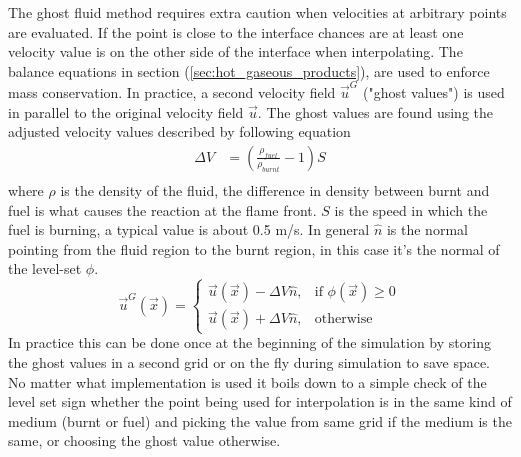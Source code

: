 \label{sec:method_two_phase_flow}
The ghost fluid method requires extra caution when velocities at arbitrary points are evaluated. If the point is close to the interface chances are at least one velocity value is on the other side of the interface when interpolating. The balance equations in section (\ref{sec:hot_gaseous_products}), are used to enforce mass conservation. In practice, a second velocity field \begin{math}\vec{u}^{ G}\end{math} ("ghost values") is used in parallel to the original velocity field \begin{math}\vec{u}\end{math}. The ghost values are found using the adjusted velocity values described by following equation
\begin{align}
\Delta V  & = (\frac{\rho_{fuel}}{\rho_{burnt}} - 1)S \\
\end{align}
where $\rho $ is the density of the fluid, the difference in density between burnt and fuel is what causes the reaction at the flame front. $S$ is the speed in which the fuel is burning, a typical value is about 0.5 m/s. In general $ \hat n$ is the normal pointing from the fluid region to the burnt region, in this case it's the normal of the level-set $ \phi $.
\begin{equation}
    \vec{u}^{G}(\vec{x})= 
\begin{cases}
    \vec{u}(\vec{x})-\Delta V \hat{n},& \text{if } \phi (\vec{x}) \geq 0\\
    \vec{u}(\vec{x})+\Delta V \hat{n},                    & \text{otherwise}
\end{cases}
\end{equation}
In practice this can be done once at the beginning of the simulation by storing the ghost values in a second grid or on the fly during simulation to save space. No matter what implementation is used it boils down to a simple check of the level set sign whether the point being used for interpolation is in the same kind of medium (burnt or fuel) and picking the value from same grid if the medium is the same, or choosing the ghost value otherwise. 